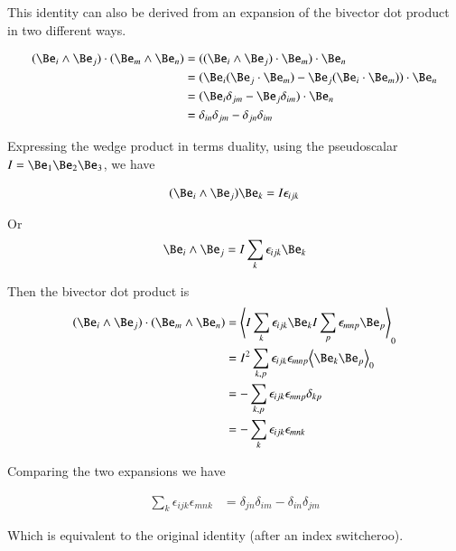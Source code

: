 \documentclass{article}
\begin{document}
This identity can also be derived from an expansion of the bivector
dot product in two different ways.

\begin{align*}
( \Be_i \wedge \Be_j ) \cdot ( \Be_m \wedge \Be_n )
&=
( ( \Be_i \wedge \Be_j ) \cdot \Be_m ) \cdot \Be_n  \\
&=
( 
\Be_i ( \Be_j \cdot \Be_m ) 
-\Be_j ( \Be_i \cdot \Be_m ) 
) \cdot \Be_n  \\
&=
( \Be_i \delta_{jm} -\Be_j \delta_{im} ) \cdot \Be_n  \\
&=
\delta_{in} \delta_{jm} -\delta_{jn} \delta_{im} 
\end{align*}

Expressing the wedge product in terms duality, using the pseudoscalar
$I = \Be_1 \Be_2 \Be_3$, we have

\begin{align*}
(\Be_i \wedge \Be_j ) \Be_k = I \epsilon_{ijk}
\end{align*}

Or
\begin{align*}
\Be_i \wedge \Be_j = I \sum_k \epsilon_{ijk} \Be_k
\end{align*}

Then the bivector dot product is
\begin{align*}
( \Be_i \wedge \Be_j ) \cdot ( \Be_m \wedge \Be_n )
&=
\gpgradezero{
I \sum_k \epsilon_{ijk} \Be_k I \sum_p \epsilon_{mnp} \Be_p
} \\
&=
I^2 \sum_{k,p} \epsilon_{ijk} \epsilon_{mnp} \gpgradezero{ \Be_k \Be_p } \\
&=
- \sum_{k,p} \epsilon_{ijk} \epsilon_{mnp} \delta_{kp} \\
&=
- \sum_{k} \epsilon_{ijk} \epsilon_{mnk} \\
\end{align*}

Comparing the two expansions we have

\begin{align*}
\sum_{k} \epsilon_{ijk} \epsilon_{mnk} &= \delta_{jn} \delta_{im} - \delta_{in} \delta_{jm} 
\end{align*}

Which is equivalent to the original identity (after an index switcheroo).



\end{document}
